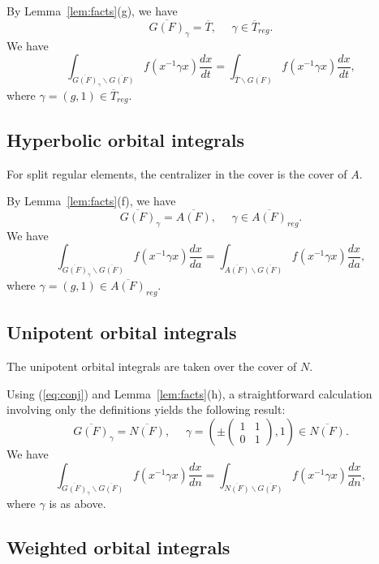 \documentclass[12pt,letterpaper,openany]{book}
\theoremstyle{plain}
\theoremstyle{definition}
\theoremstyle{remark}
\theoremstyle{remark}
\begin{document}
By Lemma~\ref{lem:facts}(g), we have
\[
\overline{G(F)}_\gamma
=\overline{T},\ \ \ \ \ \
\gamma\in \overline{T}_{reg}.
\]
We have
\begin{equation}
\int_{\overline{G(F)}_\gamma\backslash \overline{G(F)}}
f(x^{-1}\gamma x)\frac{dx}{dt}
=\int_{\overline{T}\backslash \overline{G(F)}}
f(x^{-1}\gamma x)\frac{dx}{dt},
\end{equation}
where $\gamma =(g,1)\in \overline{T}_{reg}$.

\subsection{Hyperbolic orbital integrals}

For split regular elements, the centralizer in the cover is the cover of $A$.


By Lemma~\ref{lem:facts}(f), we have
\[
\overline{G(F)}_\gamma
=\overline{A(F)},\ \ \ \ \ \
\gamma\in \overline{A(F)}_{reg}.
\]
We have
\begin{equation}
\int_{\overline{G(F)}_\gamma\backslash \overline{G(F)}}
f(x^{-1}\gamma x)\frac{dx}{da}
=\int_{\overline{A(F)}\backslash \overline{G(F)}}
f(x^{-1}\gamma x)\frac{dx}{da},
\end{equation}
where $\gamma =(g,1)\in \overline{A(F)}_{reg}$.

\subsection{Unipotent orbital integrals}

The unipotent orbital integrals are taken over the cover of $N$.


Using (\ref{eq:conj}) and Lemma~\ref{lem:facts}(h), a straightforward calculation involving only the definitions
yields the following result:
\[
\overline{G(F)}_\gamma
=\overline{N(F)},\ \ \ \ \ \
\gamma=
(
\pm \left(
\begin{array}{cc}
1 & 1\\
0 & 1
\end{array}
\right)
,1)\in \overline{N(F)}.
\]
We have
\begin{equation}
\int_{\overline{G(F)}_\gamma\backslash \overline{G(F)}}
f(x^{-1}\gamma x)\frac{dx}{dn}
=\int_{\overline{N(F)}\backslash \overline{G(F)}}
f(x^{-1}\gamma x)\frac{dx}{dn},
\end{equation}
where $\gamma $ is as above.

\subsection{Weighted orbital integrals}\label{sec:weighted-central}
\end{document}
